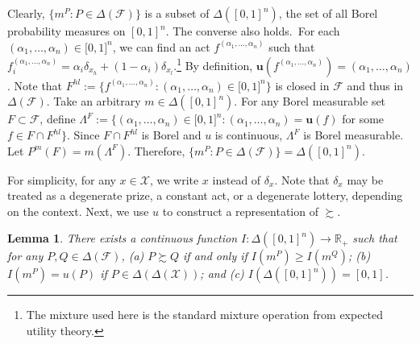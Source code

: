 \documentclass[12pt, notitlepage]{article}
\newtheorem{lemma}{Lemma}
\begin{document}
Clearly, $\{m^{P}:P\in \Delta (\mathcal{F})\}$ is a subset of $\Delta
([0,1]^{n})$, the set of all Borel probability measures on $[0,1]^{n}$. The
converse also holds.{\ For each }$(\alpha _{1},\dots ,\alpha _{n})\in
\lbrack 0,1]^{n}$, we can find an act $f^{(\alpha _{1},\dots ,\alpha _{n})}$
such that $f_{i}^{(\alpha _{1},\dots ,\alpha _{n})}=\alpha _{i}\delta
_{x_{h}}+(1-\alpha _{i})\delta _{x_{l}}$.\footnote{%
The mixture used here is the standard mixture operation from expected
utility theory.} By definition, $\mathbf{u}(f^{(\alpha _{1},\dots ,\alpha
_{n})})=(\alpha _{1},\dots ,\alpha _{n})$. Note that $F^{hl}:=\{f^{(\alpha
_{1},\dots ,\alpha _{n})}:(\alpha _{1},\dots ,\alpha _{n})\in \lbrack
0,1]^{n}\}$ is closed in $\mathcal{F}$ and thus in $\Delta (\mathcal{F})$.
Take an arbitrary $m\in \Delta ([0,1]^{n})$. For any Borel measurable set $%
F\subset \mathcal{F}$, define $\Lambda ^{F}:=\{(\alpha _{1},\dots ,\alpha
_{n})\in \lbrack 0,1]^{n}:(\alpha _{1},\dots ,\alpha _{n})=\mathbf{u}(f)$
for some $f\in F\cap F^{hl}\}$. Since $F\cap F^{hl}$ is Borel and $u$ is
continuous, $\Lambda ^{F}$ is Borel measurable. Let $P^{m}(F)=m(\Lambda
^{F}) $. Therefore, $\{m^{P}:P\in \Delta (\mathcal{F})\}=\Delta ([0,1]^{n})$.

For simplicity, for any $x\in \mathcal{X}$, we write $x$ instead of $\delta
_{x}$. Note that $\delta _{x}$ may be treated as a degenerate prize, a
constant act, or a degenerate lottery, depending on the context. Next, we
use $u$ to construct a representation of $\succsim $.

\begin{lemma}
\label{aggregator}There exists a continuous function $I:\Delta
([0,1]^{n})\rightarrow \mathbb{R}_{+}$ such that for any $P,Q\in \Delta (%
\mathcal{F})$, (a) $P\succsim Q$ if and only if $I(m^{P})\geq I(m^{Q})$; (b) 
$I(m^{P})=u(P)$ if $P\in \Delta (\Delta (\mathcal{X}))$; and (c) $I(\Delta
([0,1]^{n}))=[0,1]$.
\end{lemma}
\end{document}

